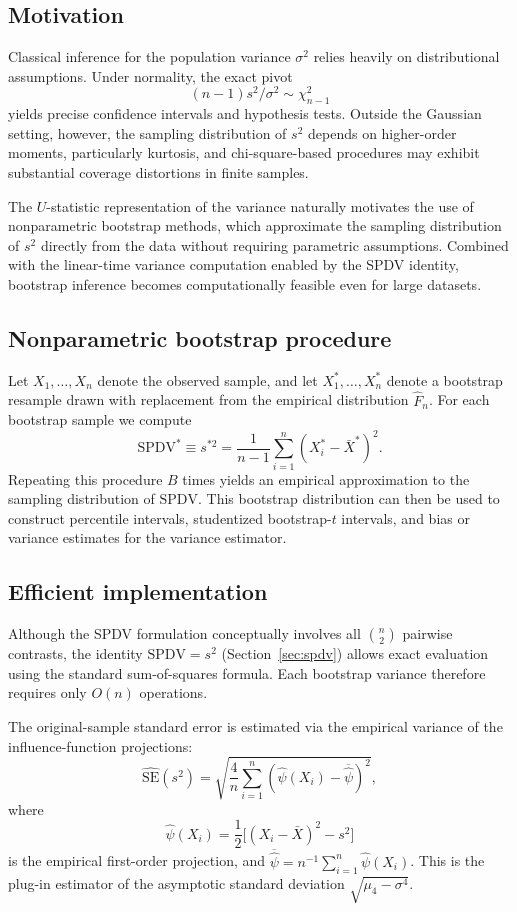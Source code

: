 \documentclass[12pt,a4paper]{article}
\begin{document}
\subsection{Motivation}

Classical inference for the population variance $\sigma^2$ relies heavily on
distributional assumptions. Under normality, the exact pivot
\[
(n-1)s^2/\sigma^2 \sim \chi^2_{n-1}
\]
yields precise confidence intervals and hypothesis tests. Outside the Gaussian
setting, however, the sampling distribution of $s^2$ depends on higher-order
moments, particularly kurtosis, and chi-square-based procedures may exhibit
substantial coverage distortions in finite samples.

The $U$-statistic representation of the variance naturally motivates the use
of nonparametric bootstrap methods, which approximate the sampling distribution
of $s^2$ directly from the data without requiring parametric assumptions.
Combined with the linear-time variance computation enabled by the SPDV identity,
bootstrap inference becomes computationally feasible even for large datasets.

\subsection{Nonparametric bootstrap procedure}

Let $X_1,\dots,X_n$ denote the observed sample, and let
$X_1^*,\dots,X_n^*$ denote a bootstrap resample drawn with replacement from the
empirical distribution $\hat F_n$. For each bootstrap sample we compute
\[
\text{SPDV}^* \equiv s^{*2}
=
\frac{1}{n-1}\sum_{i=1}^n (X_i^*-\bar X^*)^2.
\]
Repeating this procedure $B$ times yields an empirical approximation to the
sampling distribution of $\text{SPDV}$. This bootstrap distribution can then
be used to construct percentile intervals, studentized bootstrap-$t$ intervals,
and bias or variance estimates for the variance estimator.

\subsection{Efficient implementation}

Although the SPDV formulation conceptually involves all
$\binom{n}{2}$ pairwise contrasts, the identity $\text{SPDV}=s^2$
(Section~\ref{sec:spdv}) allows exact evaluation using the standard
sum-of-squares formula. Each bootstrap variance therefore requires only
$O(n)$ operations.

The original-sample standard error is estimated via the empirical variance of the influence-function projections:
\[
\widehat{\mathrm{SE}}(s^2)
=
\sqrt{
\frac{4}{n}
\sum_{i=1}^n
\left(
\hat{\psi}(X_i) - \overline{\hat{\psi}}
\right)^2
},
\]
where
\[
\hat{\psi}(X_i)
=
\frac{1}{2}\bigl[(X_i - \bar{X})^2 - s^2\bigr]
\]
is the empirical first-order projection, and $\overline{\hat{\psi}} = n^{-1} \sum_{i=1}^n \hat{\psi}(X_i)$. This is the plug-in estimator of the asymptotic standard deviation $\sqrt{\mu_4 - \sigma^4}$.
\end{document}
